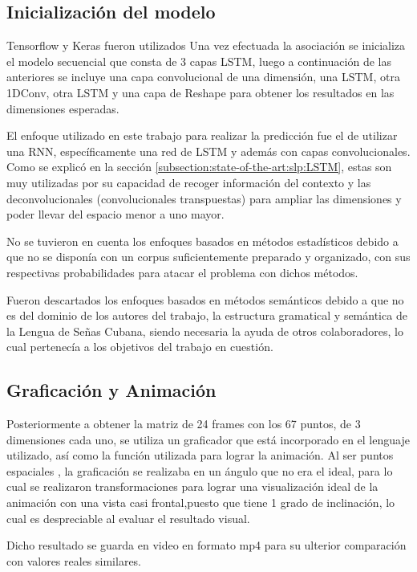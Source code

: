 \subsection{Inicialización del modelo}Tensorflow y Keras fueron utilizados 
Una vez efectuada la asociación se inicializa el modelo secuencial que consta de 3 capas LSTM, luego a continuación de las anteriores se incluye una capa convolucional de una dimensión, una LSTM, otra 1DConv, otra LSTM y una capa de Reshape para obtener los resultados en las dimensiones esperadas.

El enfoque utilizado en este trabajo para realizar la predicción fue el de utilizar una RNN, específicamente una red de LSTM y además con capas convolucionales. Como se explicó en
la sección \ref{subsection:state-of-the-art:slp:LSTM}, estas son muy utilizadas por su capacidad de recoger información del contexto y las deconvolucionales (convolucionales transpuestas) para ampliar las dimensiones y poder llevar del espacio menor a uno mayor.

No se tuvieron en cuenta los enfoques basados en métodos estadísticos debido a que no
se disponía con un corpus suficientemente preparado y organizado, con sus respectivas
probabilidades para atacar el problema con dichos métodos.

Fueron descartados los enfoques basados en métodos semánticos debido a que  no es del dominio de los autores del trabajo, la estructura gramatical y  semántica de la Lengua de Señas Cubana, siendo
necesaria la ayuda de otros colaboradores, lo cual pertenecía a los objetivos del trabajo en cuestión.

\subsection{Graficación y Animación}
Posteriormente a obtener la matriz de 24 frames con los 67 puntos, de 3 dimensiones cada uno, se utiliza un graficador que está incorporado en el lenguaje utilizado, así como la función utilizada para lograr la animación.
Al ser puntos espaciales , la graficación se realizaba en un ángulo que no era el ideal, para lo cual se realizaron transformaciones para lograr una visualización ideal de la animación con una vista casi frontal,puesto que tiene 1 grado de inclinación, lo cual es despreciable al evaluar el resultado visual.

Dicho resultado se guarda en video en formato mp4 para su ulterior comparación con valores reales similares.
